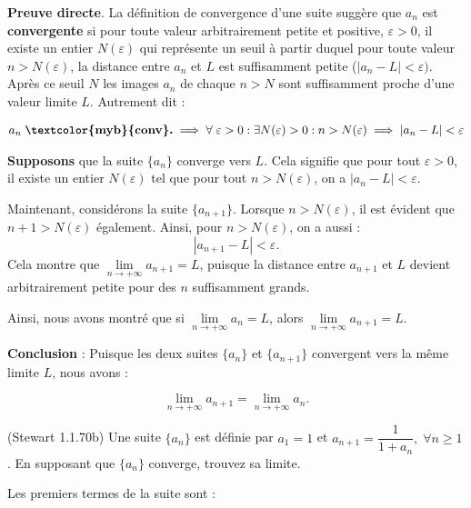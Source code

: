 \documentclass{report}
\begin{document}
    \textbf{Preuve directe}. La définition de convergence d'une suite suggère que $a_n$ 
    est \textbf{convergente} si pour toute valeur arbitrairement petite et positive, 
    $\varepsilon > 0$, il existe un entier $N(\varepsilon)$ 
    qui représente un seuil à partir duquel 
    pour toute valeur $n > N(\varepsilon)$, la distance entre $a_n$ et $L$ 
    est suffisamment petite ($|a_n - L| < \varepsilon)$. Après ce seuil $N$ 
    les images $a_n$ de chaque $n > N$ sont suffisamment proche d'une valeur limite 
    $L$. Autrement dit :

    \begin{align*}
        a_n \; \textbf{\textcolor{myb}{conv}.}  \implies 
        \forall \; \varepsilon > 0 : \exists N(\varepsilon) > 0 : n > N(\varepsilon) 
        \implies |a_n - L| < \varepsilon
    \end{align*} 


    \textbf{Supposons} que la suite $\{a_n\}$ converge vers $L$. Cela signifie que pour tout 
    $\varepsilon > 0$, il existe un entier $N(\varepsilon)$ tel que pour tout $n > N(\varepsilon)$, 
    on a $|a_n - L| < \varepsilon$. 

    Maintenant, considérons la suite \(\{a_{n+1}\}\). Lorsque $n > N(\varepsilon)$, 
    il est évident que $n+1 > N(\varepsilon)$ également. Ainsi, pour $n > N(\varepsilon)$, 
    on a aussi :
    \[
    |a_{n+1} - L| < \varepsilon.
    \]
    Cela montre que \(\lim\limits_{n \to +\infty} a_{n+1} = L\), puisque la distance 
    entre \(a_{n+1}\) et \(L\) devient arbitrairement petite pour des \(n\) suffisamment grands.

    Ainsi, nous avons montré que si \(\lim\limits_{n \to +\infty} a_n = L\), alors 
    \(\lim\limits_{n \to +\infty} a_{n+1} = L\).

    \textbf{Conclusion} : Puisque les deux suites \(\{a_n\}\) et \(\{a_{n+1}\}\) convergent 
    vers la même limite \(L\), nous avons :

    \[
    \boxed{\lim\limits_{n \to +\infty} a_{n+1} = \lim\limits_{n \to +\infty} a_n.}
\]

                

    \begin{Exercice}{(Stewart 1.1.70b)}{}
        Une suite $\{a_n\}$ est définie par $a_1 = 1$ et $a_{n+1} = \dfrac{1}{1+a_n}, \; \forall n\geq 1$. 
        En supposant que $\{a_n\}$ converge, trouvez sa limite.
    \end{Exercice}

    Les premiers termes de la suite sont :
\end{document}
